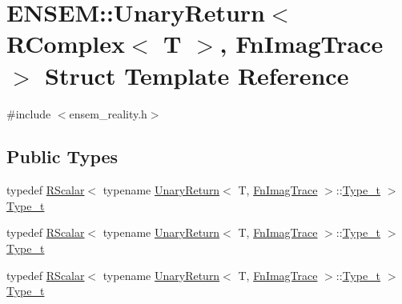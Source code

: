 \hypertarget{structENSEM_1_1UnaryReturn_3_01RComplex_3_01T_01_4_00_01FnImagTrace_01_4}{}\section{E\+N\+S\+EM\+:\+:Unary\+Return$<$ R\+Complex$<$ T $>$, Fn\+Imag\+Trace $>$ Struct Template Reference}
\label{structENSEM_1_1UnaryReturn_3_01RComplex_3_01T_01_4_00_01FnImagTrace_01_4}


{\ttfamily \#include $<$ensem\+\_\+reality.\+h$>$}

\subsection*{Public Types}
\begin{DoxyCompactItemize}
\item 
typedef \mbox{\hyperlink{classENSEM_1_1RScalar}{R\+Scalar}}$<$ typename \mbox{\hyperlink{structENSEM_1_1UnaryReturn}{Unary\+Return}}$<$ T, \mbox{\hyperlink{structENSEM_1_1FnImagTrace}{Fn\+Imag\+Trace}} $>$\+::\mbox{\hyperlink{structENSEM_1_1UnaryReturn_3_01RComplex_3_01T_01_4_00_01FnImagTrace_01_4_a0a6fd745f329be78992f62eebd7ef256}{Type\+\_\+t}} $>$ \mbox{\hyperlink{structENSEM_1_1UnaryReturn_3_01RComplex_3_01T_01_4_00_01FnImagTrace_01_4_a0a6fd745f329be78992f62eebd7ef256}{Type\+\_\+t}}
\item 
typedef \mbox{\hyperlink{classENSEM_1_1RScalar}{R\+Scalar}}$<$ typename \mbox{\hyperlink{structENSEM_1_1UnaryReturn}{Unary\+Return}}$<$ T, \mbox{\hyperlink{structENSEM_1_1FnImagTrace}{Fn\+Imag\+Trace}} $>$\+::\mbox{\hyperlink{structENSEM_1_1UnaryReturn_3_01RComplex_3_01T_01_4_00_01FnImagTrace_01_4_a0a6fd745f329be78992f62eebd7ef256}{Type\+\_\+t}} $>$ \mbox{\hyperlink{structENSEM_1_1UnaryReturn_3_01RComplex_3_01T_01_4_00_01FnImagTrace_01_4_a0a6fd745f329be78992f62eebd7ef256}{Type\+\_\+t}}
\item 
typedef \mbox{\hyperlink{classENSEM_1_1RScalar}{R\+Scalar}}$<$ typename \mbox{\hyperlink{structENSEM_1_1UnaryReturn}{Unary\+Return}}$<$ T, \mbox{\hyperlink{structENSEM_1_1FnImagTrace}{Fn\+Imag\+Trace}} $>$\+::\mbox{\hyperlink{structENSEM_1_1UnaryReturn_3_01RComplex_3_01T_01_4_00_01FnImagTrace_01_4_a0a6fd745f329be78992f62eebd7ef256}{Type\+\_\+t}} $>$ \mbox{\hyperlink{structENSEM_1_1UnaryReturn_3_01RComplex_3_01T_01_4_00_01FnImagTrace_01_4_a0a6fd745f329be78992f62eebd7ef256}{Type\+\_\+t}}
\end{DoxyCompactItemize}


